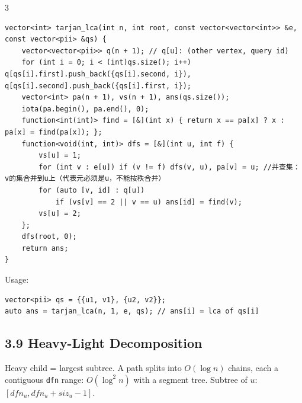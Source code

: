 \documentclass[8pt]{extarticle}
\begin{document}
\begin{multicols*}{3}
\begin{lstlisting}
vector<int> tarjan_lca(int n, int root, const vector<vector<int>> &e, const vector<pii> &qs) {
    vector<vector<pii>> q(n + 1); // q[u]: (other vertex, query id)
    for (int i = 0; i < (int)qs.size(); i++) q[qs[i].first].push_back({qs[i].second, i}), q[qs[i].second].push_back({qs[i].first, i});
    vector<int> pa(n + 1), vs(n + 1), ans(qs.size());
    iota(pa.begin(), pa.end(), 0);
    function<int(int)> find = [&](int x) { return x == pa[x] ? x : pa[x] = find(pa[x]); };
    function<void(int, int)> dfs = [&](int u, int f) {
        vs[u] = 1;
        for (int v : e[u]) if (v != f) dfs(v, u), pa[v] = u; //并查集：v的集合并到u上（代表元必须是u，不能按秩合并）
        for (auto [v, id] : q[u])
            if (vs[v] == 2 || v == u) ans[id] = find(v);
        vs[u] = 2;
    };
    dfs(root, 0);
    return ans;
}
\end{lstlisting}

Usage:

\begin{lstlisting}
vector<pii> qs = {{u1, v1}, {u2, v2}};
auto ans = tarjan_lca(n, 1, e, qs); // ans[i] = lca of qs[i]
\end{lstlisting}

\subsection*{3.9 Heavy-Light Decomposition}

Heavy child = largest subtree. A path splits into $O(\log n)$ chains, each a contiguous \texttt{dfn} range: $O(\log^2 n)$ with a segment tree. Subtree of $u$: $[dfn_u, dfn_u + siz_u - 1]$.


\end{multicols*}
\end{document}
